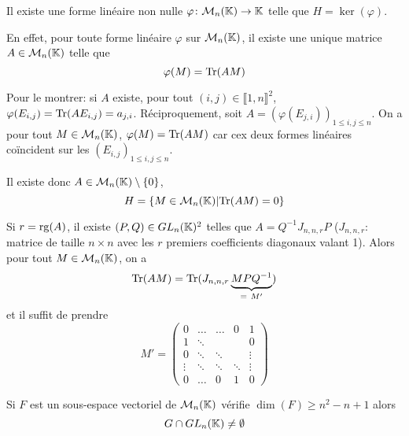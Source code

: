 \documentclass[12pt]{article}
\begin{document}
\begin{remark}
    Il existe une forme linéaire non nulle $\varphi\colon\mathcal{M}_{n}(\mathbb{K})\to \mathbb{K}$ telle que $H=\ker(\varphi)$. 

    En effet, pour toute forme linéaire $\varphi$ sur $\mathcal{M}_{n}(\mathbb{K})$, il existe une unique matrice $A\in\mathcal{M}_{n}(\mathbb{K})$ telle que 
    \begin{equation}
        \varphi(M)=\operatorname{Tr}(AM)
    \end{equation}

    Pour le montrer: si $A$ existe, pour tout $(i,j)\in\llbracket1,n\rrbracket^{2}$, $\varphi(E_{i,j})=\operatorname{Tr}(AE_{i,j})=a_{j,i}$. Réciproquement, soit $A=\left(\varphi(E_{j,i})\right)_{1\leqslant i,j\leqslant n}$. On a pour tout $M\in\mathcal{M}_{n}(\mathbb{K})$, $\varphi(M)=\operatorname{Tr}(AM)$ car cex deux formes linéaires coïncident sur les $(E_{i,j})_{1\leqslant i,j\leqslant n}$.

    Il existe donc $A\in \mathcal{M}_{n}(\mathbb{K})\setminus\lbrace0\rbrace$,
    \begin{equation}
        H=\left\lbrace M\in\mathcal{M}_{n}(\mathbb{K})\middle|\operatorname{Tr}(AM)=0\right\rbrace
    \end{equation}

    Si $r=\operatorname{rg}(A)$, il existe $(P,Q)\in GL_{n}(\mathbb{K})^{2}$ telles que $A=Q^{-1}J_{n,n,r}P$ ($J_{n,n,r}$: matrice de taille $n\times n$ avec les $r$ premiers coefficients diagonaux valant 1). Alors pour tout $M\in \mathcal{M}_{n}(\mathbb{K})$, on a 
    \begin{equation}
        \operatorname{Tr}(AM)=\operatorname{Tr}(J_{n,n,r}\underbrace{MPQ^{-1}}_{=~M'})
    \end{equation}
    et il suffit de prendre 
    \begin{equation}
        M'=
        \begin{pmatrix}
            0 & \dots & \dots & 0 & 1\\
            1 & \ddots & & & 0\\
            0 & \ddots & \ddots& & \vdots\\
            \vdots & \ddots & \ddots&\ddots & \vdots\\
            0 & \dots& 0 & 1 & 0
        \end{pmatrix}
    \end{equation}
\end{remark}

\begin{remark}
    Si $F$ est un sous-espace vectoriel de $\mathcal{M}_{n}(\mathbb{K})$ vérifie $\dim(F)\geqslant n^{2}-n+1$ alors 
    \begin{equation}
        G\cap GL_{n}(\mathbb{K})\neq\emptyset
    \end{equation}
\end{remark}
\end{document}
